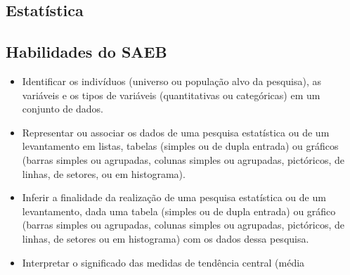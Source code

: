 \begin{escolha}
\begin{boxmedio}
\begin{boxmedio}
{\begin{boxpeq}
\begin{boxpeq}
{\begin{boxpeq}
\begin{boxmedio}
\begin{boxmedio}
\begin{boxpeq}
\begin{boxmedio}
\begin{boxpeq}
\begin{boxpeq}
\begin{boxpeq}
\begin{boxpeq}
\begin{boxmedio}
{\begin{boxmedio}
\begin{boxmedio}
\begin{boxpeq}
\begin{boxmedio}
\begin{boxpeq}
\begin{boxpeq}
\begin{boxpeq}
\begin{escolha}
{\begin{boxmedio}
\begin{boxpeq}
\begin{boxpeq}
\begin{boxpeq}
\begin{boxpeq}
\begin{boxpeq}
\begin{boxmedio}
\begin{boxpeq}
\begin{boxpeq}
\begin{boxpeq}
{\begin{boxpeq}
\begin{boxmedio}
\begin{boxpeq}
\begin{boxpeq}
\begin{boxpeq}
{\begin{boxpeq}
\begin{boxmedio}
{\begin{boxpeq}
\begin{boxpeq}
\begin{boxmedio}
\begin{boxmedio}
\begin{boxpeq}
\begin{boxpeq}
{\begin{boxpeq}
\begin{boxpeq}
\begin{boxpeq}
\begin{boxpeq}
\begin{boxpeq}
\begin{escolha}
\begin{escolha}
{\begin{boxmedio}
\begin{boxpeq}
\begin{q°}
\begin{boxmedio}
\begin{boxpeq}
\begin{boxpeq}
\begin{boxmedio}
\begin{boxmedio}
\begin{boxmedio}
\chapter{Estatística}

\section{Habilidades do SAEB}

\begin{itemize}

  \item Identificar os indivíduos (universo ou população alvo da pesquisa), as
variáveis e os tipos de variáveis (quantitativas ou categóricas) em um
conjunto de dados.
  \item Representar ou associar os dados de uma pesquisa estatística ou de um
levantamento em listas, tabelas (simples ou de dupla entrada) ou gráficos
(barras simples ou agrupadas, colunas simples ou agrupadas, pictóricos,
de linhas, de setores, ou em histograma).
  \item Inferir a finalidade da realização de uma pesquisa estatística ou de um
levantamento, dada uma tabela (simples ou de dupla entrada) ou gráfico
(barras simples ou agrupadas, colunas simples ou agrupadas, pictóricos,
de linhas, de setores ou em histograma) com os dados dessa pesquisa. 
  \item Interpretar o significado das medidas de tendência central (média

\end{itemize}
\end{boxmedio}
\end{boxmedio}
\end{boxmedio}
\end{boxpeq}
\end{boxpeq}
\end{boxmedio}
\end{q°}
\end{boxpeq}
\end{boxmedio}}
\end{escolha}
\end{escolha}
\end{boxpeq}
\end{boxpeq}
\end{boxpeq}
\end{boxpeq}
\end{boxpeq}}
\end{boxpeq}
\end{boxpeq}
\end{boxmedio}
\end{boxmedio}
\end{boxpeq}
\end{boxpeq}}
\end{boxmedio}
\end{boxpeq}}
\end{boxpeq}
\end{boxpeq}
\end{boxpeq}
\end{boxmedio}
\end{boxpeq}}
\end{boxpeq}
\end{boxpeq}
\end{boxpeq}
\end{boxmedio}
\end{boxpeq}
\end{boxpeq}
\end{boxpeq}
\end{boxpeq}
\end{boxpeq}
\end{boxmedio}}
\end{escolha}
\end{boxpeq}
\end{boxpeq}
\end{boxpeq}
\end{boxmedio}
\end{boxpeq}
\end{boxmedio}
\end{boxmedio}}
\end{boxmedio}
\end{boxpeq}
\end{boxpeq}
\end{boxpeq}
\end{boxpeq}
\end{boxmedio}
\end{boxpeq}
\end{boxmedio}
\end{boxmedio}
\end{boxpeq}}
\end{boxpeq}
\end{boxpeq}}
\end{boxmedio}
\end{boxmedio}
\end{escolha}
